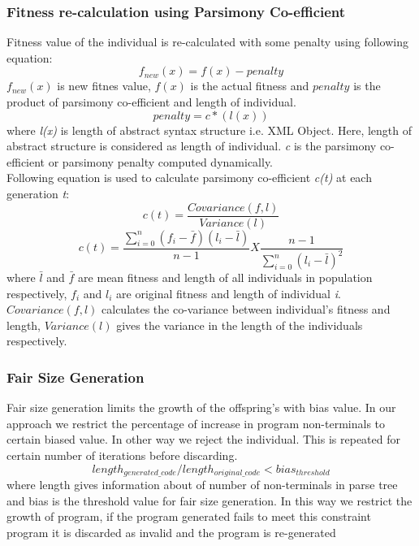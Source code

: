 \documentclass{acm_proc_article-sp}
\begin{document}
\subsubsection*{\textbf{Fitness re-calculation using Parsimony Co-efficient}} \label{p_co-ef}
Fitness value of the individual is re-calculated with some penalty using following equation:
\[f_{new}(x) = f(x) - penalty  \]
$f_{new}(x)$ is new fitnes value, $f(x)$ is the actual fitness and $penalty$ is the product of parsimony co-efficient and length of individual.
\[penalty = c*(l(x))\]
where \textit{l(x)} is length of abstract syntax structure i.e. XML Object. Here, length of abstract structure is considered as length of individual. \textit{c} is the parsimony co-efficient or parsimony penalty computed dynamically. \\
Following equation is used to calculate parsimony co-efficient \textit{c(t)} at each generation \textit{t}:
\[ c(t) = \frac{Covariance(f,l)}{Variance(l)}\]
\[ c(t) = \frac{\sum_{i=0}^{n}(f_{i}-\bar{f})(l_{i}-\bar{l})}{n-1} X  \frac{n-1}{\sum_{i=0}^{n}(l_{i}-\bar{l})^2}\]
where $\bar{l}$ and $\bar{f}$ are mean fitness and length of all individuals in population respectively, $f_{i}$ and $l_{i}$ are original fitness and length of individual \textit{i}.\\
\indent $Covariance(f,l)$ calculates the co-variance between individual's fitness and length, $Variance(l)$ gives the variance in the length of the individuals respectively.

\subsubsection*{\textbf{Fair Size Generation}}
Fair size generation limits the growth of the offspring's with bias value. In our approach we restrict the percentage of increase in program non-terminals to certain biased value. In other way we reject the individual. This is repeated for certain number of iterations before discarding. 
\[length_{generated\_code}/length_{original\_code} < bias_{threshold}\]
\indent where length gives information about of number of non-terminals in parse tree and bias is the threshold value for fair size generation. In this way we restrict the growth of program, if the program generated fails to meet this constraint program it is discarded as invalid and the program is re-generated
\end{document}
